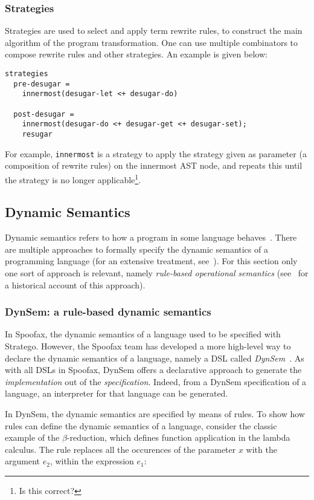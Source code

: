 \subsubsection{Strategies}
\label{sec:orgheadline5}
Strategies are used to select and apply term rewrite rules, to
construct the main algorithm of the program transformation. One can
use multiple combinators to compose rewrite rules and other
strategies. An example is given below:
\begin{verbatim}
strategies
  pre-desugar =
    innermost(desugar-let <+ desugar-do)

  post-desugar =
    innermost(desugar-do <+ desugar-get <+ desugar-set);
    resugar
\end{verbatim}
For example, \texttt{innermost} is a strategy to apply the strategy given as
parameter (a composition of rewrite rules) on the innermost AST node,
and repeats this until the strategy is no longer applicable\footnote{Is
this correct?}.
\subsection{Dynamic Semantics}
\label{sec-dynamic-semantics}
Dynamic semantics refers to how a program in some language
behaves~\cite{Winskel93}. There are multiple approaches to
formally specify the dynamic semantics of a programming language (for
an extensive treatment, see~\cite{Winskel93}). For this section
only one sort of approach is relevant, namely \emph{rule-based operational}
\emph{semantics} (see~\cite{Plotkin04} for a historical account of this
approach).

\subsubsection{DynSem: a rule-based dynamic semantics}
\label{ssec-dynsem}
In Spoofax, the dynamic semantics of a language used to be specified
with Stratego. However, the Spoofax team has developed a more
high-level way to declare the dynamic semantics of a language, namely
a DSL called \emph{DynSem}~\cite{VerguNV15}. As with all DSLs in
Spoofax, DynSem offers a declarative approach to generate the
\emph{implementation} out of the \emph{specification}. Indeed, from a DynSem
specification of a language, an interpreter for that language can be
generated.

In DynSem, the dynamic semantics are specified by means of rules. To
show how rules can define the dynamic semantics of a language,
consider the classic example of the \(\beta\)-reduction, which defines
function application in the lambda calculus. The rule replaces all the
occurences of the parameter \(x\) with the argument \(e_2\), within the
expression \(e_1\):

